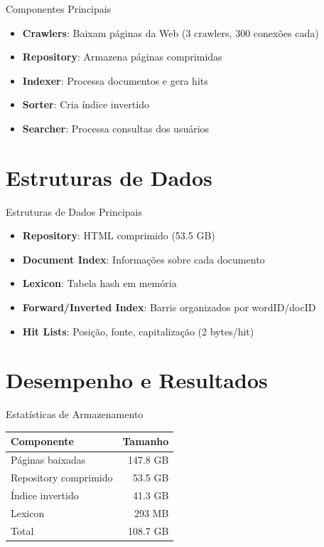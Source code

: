 \documentclass{beamer}
\begin{document}
\begin{frame}{Componentes Principais}
    \begin{itemize}
        \item \textbf{Crawlers}: Baixam páginas da Web (3 crawlers, 300 conexões cada)
        \item \textbf{Repository}: Armazena páginas comprimidas
        \item \textbf{Indexer}: Processa documentos e gera hits
        \item \textbf{Sorter}: Cria índice invertido
        \item \textbf{Searcher}: Processa consultas dos usuários
    \end{itemize}
\end{frame}

\section{Estruturas de Dados}
\begin{frame}{Estruturas de Dados Principais}
    \begin{itemize}
        \item \textbf{Repository}: HTML comprimido (53.5 GB)
        \item \textbf{Document Index}: Informações sobre cada documento
        \item \textbf{Lexicon}: Tabela hash em memória
        \item \textbf{Forward/Inverted Index}: Barris organizados por wordID/docID
        \item \textbf{Hit Lists}: Posição, fonte, capitalização (2 bytes/hit)
    \end{itemize}
\end{frame}

\section{Desempenho e Resultados}
\begin{frame}{Estatísticas de Armazenamento}
    \begin{center}
        \begin{tabular}{|l|r|}
            \hline
            \textbf{Componente} & \textbf{Tamanho} \\
            \hline
            Páginas baixadas & 147.8 GB \\
            Repository comprimido & 53.5 GB \\
            Índice invertido & 41.3 GB \\
            Lexicon & 293 MB \\
            Total & 108.7 GB \\
            \hline
        \end{tabular}
    \end{center}
\end{frame}
\end{document}
